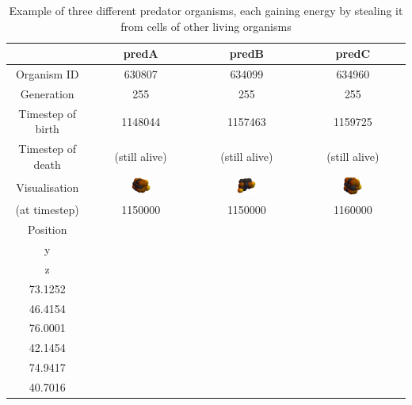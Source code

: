 \begin{table}[H]
 \begin{tabular}{ c || c | c | c |} 
    & predA & predB & predC \\ [0.5ex] \hline \hline
     Organism ID & 630807 & 634099 & 634960 \\ \hline
     Generation & 255 & 255 & 255 \\ \hline
     Timestep of birth & 1148044 & 1157463 & 1159725 \\ \hline
     Timestep of death & (still alive) & (still alive) & (still alive) \\ \hline
     Visualisation & 
        \includegraphics[width=0.2\textwidth]{figure/3orgs/predA} &
        \includegraphics[width=0.2\textwidth]{figure/3orgs/predB} &
        \includegraphics[width=0.2\textwidth]{figure/3orgs/predC} \\
     (at timestep) & 1150000 & 1150000 & 1160000 \\ \hline
     Position \(\left(\begin{array}{l} x\\y\\z\end{array}\right)\) & 
        \(\left(\begin{array}{l} 318.756\\73.1252\\46.4154 \end{array}\right)\) &
        \(\left(\begin{array}{l} 330.843\\76.0001\\42.1454\end{array}\right)\) &
        \(\left(\begin{array}{l} 338.39\\74.9417\\40.7016\end{array}\right)\)\\ \hline
 \end{tabular}
\caption{Example of three different predator organisms, each gaining energy by stealing it from cells of other living organisms}
\label{tab:3pred}
\end{table}

